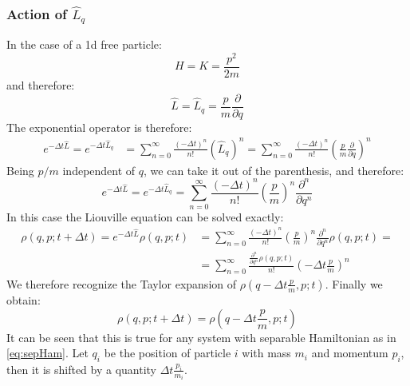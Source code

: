             \subsubsection{Action of $\hat{L}_q$}
            In the case of a 1d free particle:
            \begin{equation}
                H=K=\frac{p^2}{2m}
            \end{equation}
            and therefore:
            \begin{equation}
                \hat{L}=\hat{L}_q=\frac{p}{m}\frac{\partial}{\partial q}
            \end{equation}
            The exponential operator is therefore:
            \begin{align*}
                e^{-\Delta t \hat{L}}=e^{-\Delta t \hat{L}_q}&=\sum_{n=0}^\infty\frac{(-\Delta t)^n}{n!}(\hat{L}_q)^n=\sum_{n=0}^\infty\frac{(-\Delta t)^n}{n!}\left(\frac{p}{m}\frac{\partial}{\partial q}\right)^n
            \end{align*}
            Being $p/m$ independent of $q$, we can take it out of the parenthesis, and therefore:
            \begin{equation}
                e^{-\Delta t \hat{L}}=e^{-\Delta t \hat{L}_q}=\sum_{n=0}^\infty\frac{(-\Delta t)^n}{n!}\left(\frac{p}{m}\right)^n\frac{\partial^n}{\partial q^n}
            \end{equation}
            In this case the Liouville equation can be solved exactly:
            \begin{align*}
                \rho(q,p;t+\Delta t)=e^{-\Delta t \hat{L}}\rho(q,p;t)&=\sum_{n=0}^\infty\frac{(-\Delta t)^n}{n!}\left(\frac{p}{m}\right)^n\frac{\partial^n}{\partial q^n}\rho(q,p;t)=\\
                &=\sum_{n=0}^\infty\frac{\frac{\partial^n}{\partial q^n}\rho(q,p;t)}{n!}\left(-\Delta t\frac{p}{m}\right)^n
            \end{align*}
            We therefore recognize the Taylor expansion of $\rho(q-\Delta t\frac{p}{m},p;t)$. Finally we obtain:
            \begin{equation}
                \rho(q,p;t+\Delta t)=\rho(q-\Delta t\frac{p}{m},p;t)
            \end{equation}
            It can be seen that this is true for any system with separable Hamiltonian as in \ref{eq:sepHam}. Let $q_i$ be the position of particle $i$ with mass $m_i$ and momentum $p_i$, then it is shifted by a quantity $\Delta t\frac{p_i}{m_i}$.
            
